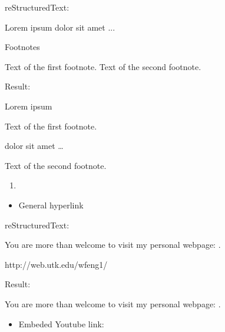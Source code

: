 \documentclass[letterpaper,12pt,english]{sphinxmanual}
\begin{document}
reStructuredText:

\begin{sphinxVerbatim}[commandchars=\\\{\}]
Lorem ipsum  dolor sit amet ... 

  Footnotes

  Text of the first footnote.
  Text of the second footnote.
\end{sphinxVerbatim}

Result:

Lorem ipsum %
\begin{footnote}[1]\sphinxAtStartFootnote
Text of the first footnote.
%
\end{footnote} dolor sit amet … %
\begin{footnote}[2]\sphinxAtStartFootnote
Text of the second footnote.
%
\end{footnote}
\begin{enumerate}
\def\theenumi{\arabic{enumi}}
\def\labelenumi{\theenumi .}
\makeatletter\def\p@enumii{\p@enumi \theenumi .}\makeatother
\setcounter{enumi}{6}
\item {} 

\end{enumerate}
\begin{itemize}
\item {} 
General hyperlink

\end{itemize}

reStructuredText:

\begin{sphinxVerbatim}[commandchars=\\\{\}]
You are more than welcome to visit my personal webpage: .

  http://web.utk.edu/\PYGZti{}wfeng1/
\end{sphinxVerbatim}

Result:

You are more than welcome to visit my personal webpage: .
\begin{itemize}
\item {} 
Embeded Youtube link:

\end{itemize}
\end{document}
